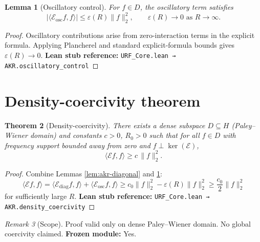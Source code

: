 \documentclass[11pt]{article}
\theoremstyle{plain}
\newtheorem{theorem}{Theorem}
\newtheorem{lemma}[theorem]{Lemma}
\theoremstyle{definition}
\theoremstyle{remark}
\newtheorem{remark}[theorem]{Remark}
\newcommand{\cE}{\mathcal{E}}
\begin{document}
\begin{lemma}[Oscillatory control]\label{lem:akr-oscillatory}
For $f\in D$, the oscillatory term satisfies
\[
|\langle \cE_{\mathrm{osc}} f,f\rangle| \le \varepsilon(R)\|f\|_2^2,
\qquad \varepsilon(R)\to 0 \text{ as } R\to\infty.
\]
\end{lemma}

\begin{proof}
Oscillatory contributions arise from zero-interaction terms in the explicit formula.  
Applying Plancherel and standard explicit-formula bounds gives $\varepsilon(R)\to 0$.  
\textbf{Lean stub reference:} \texttt{URF\_Core.lean → AKR.oscillatory\_control}
\end{proof}

\section{Density-coercivity theorem}

\begin{theorem}[Density-coercivity]\label{thm:akr-density}
There exists a dense subspace $D\subseteq H$ (Paley--Wiener domain) and constants $c>0$, $R_0>0$ such that for all $f\in D$ with frequency support bounded away from zero and $f\perp \ker(\cE)$,
\[
\langle \cE f,f\rangle \ge c\,\|f\|_2^2.
\]
\end{theorem}

\begin{proof}
Combine Lemmas \ref{lem:akr-diagonal} and \ref{lem:akr-oscillatory}:  
\[
\langle \cE f,f\rangle
=
\langle \cE_{\mathrm{diag}} f,f\rangle + \langle \cE_{\mathrm{osc}} f,f\rangle
\ge c_0 \|f\|_2^2 - \varepsilon(R)\|f\|_2^2
\ge \frac{c_0}{2} \|f\|_2^2
\]
for sufficiently large $R$.  
\textbf{Lean stub reference:} \texttt{URF\_Core.lean → AKR.density\_coercivity}
\end{proof}

\begin{remark}[Scope]
Proof valid only on dense Paley--Wiener domain. No global coercivity claimed.  
\textbf{Frozen module:} Yes.
\end{remark}
\end{document}
